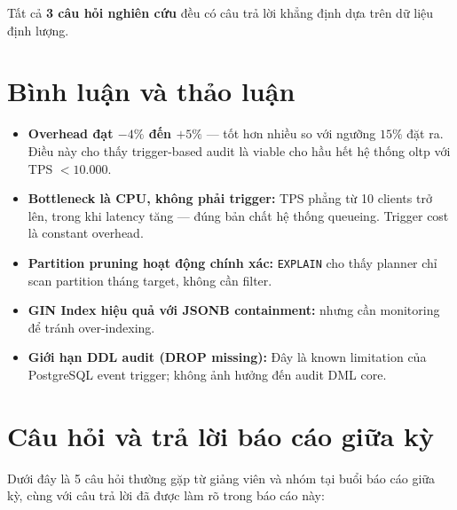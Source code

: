 Tất cả \textbf{3 câu hỏi nghiên cứu} đều có câu trả lời khẳng định dựa trên dữ liệu định lượng.

\section{Bình luận và thảo luận}

\begin{itemize}
    \item \textbf{Overhead đạt $-4\%$ đến $+5\%$} --- tốt hơn nhiều so với ngưỡng $15\%$ đặt ra. Điều này cho thấy trigger-based audit là viable cho hầu hết hệ thống \ac{oltp} với TPS $< 10.000$.
    \item \textbf{Bottleneck là CPU, không phải trigger:} TPS phẳng từ 10 clients trở lên, trong khi latency tăng --- đúng bản chất hệ thống queueing. Trigger cost là constant overhead.
    \item \textbf{Partition pruning hoạt động chính xác:} \texttt{EXPLAIN} cho thấy planner chỉ scan partition tháng target, không cần filter.
    \item \textbf{GIN Index hiệu quả với JSONB containment:} nhưng cần monitoring để tránh over-indexing.
    \item \textbf{Giới hạn DDL audit (DROP missing):} Đây là known limitation của PostgreSQL event trigger; không ảnh hưởng đến audit DML core.
\end{itemize}

\section{Câu hỏi và trả lời báo cáo giữa kỳ}

Dưới đây là 5 câu hỏi thường gặp từ giảng viên và nhóm tại buổi báo cáo giữa kỳ, cùng với câu trả lời đã được làm rõ trong báo cáo này:

